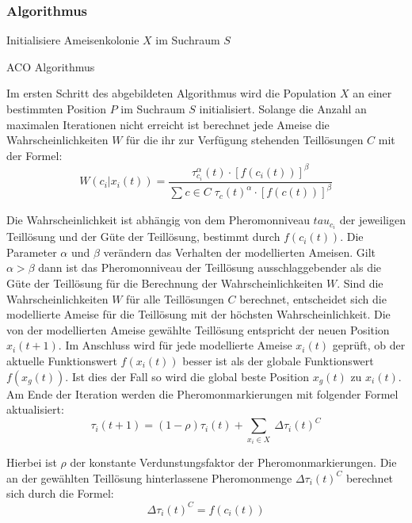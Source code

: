 \documentclass[a4paper, 11pt]{article}
\begin{document}
\subsubsection{Algorithmus}
\begin{framed}
	\begin{algorithm}[H]
		Initialisiere Ameisenkolonie $X$ im Suchraum $S$\;
		\caption{\acs{ACO} Algorithmus}
		\label{acoalgo}
	\end{algorithm}
\end{framed}
Im ersten Schritt des abgebildeten Algorithmus wird die Population $X$ an einer bestimmten Position $P$ im Suchraum $S$ initialisiert. Solange die Anzahl an maximalen Iterationen nicht erreicht ist berechnet jede Ameise die Wahrscheinlichkeiten $W$ für die ihr zur Verfügung stehenden Teillösungen $C$ mit der Formel:
\begin{equation}
W(c_{i}|x_{i}(t)) = \frac{\tau_{c_{i}}^\alpha(t) \cdot [f(c_{i}(t))]^\beta}{\sum_{} c \in C\; \tau_{c}(t)^\alpha \cdot [f(c(t))]^\beta}
\end{equation}
\par Die Wahrscheinlichkeit ist abhängig von dem Pheromonniveau $tau_{c_{i}}$ der jeweiligen Teillösung und der Güte der Teillösung, bestimmt durch $f(c_{i}(t))$. Die Parameter $\alpha$ und $\beta$ verändern das Verhalten der modellierten Ameisen. Gilt $\alpha > \beta$ dann ist das Pheromonniveau der Teillösung ausschlaggebender als die Güte der Teillösung für die Berechnung der Wahrscheinlichkeiten $W$. Sind die Wahrscheinlichkeiten $W$ für alle Teillösungen $C$ berechnet, entscheidet sich die modellierte Ameise für die Teillösung mit der höchsten Wahrscheinlichkeit. Die von der modellierten Ameise gewählte Teillösung entspricht der neuen Position $x_{i}(t+1)$. Im Anschluss wird für jede modellierte Ameise $x_{i}(t)$ geprüft, ob der aktuelle Funktionswert $f(x_{i}(t))$  besser ist als der globale Funktionswert $f(x_{g}(t))$. Ist dies der Fall so wird die global beste Position $x_{g}(t)$ zu $x_{i}(t)$. Am Ende der Iteration werden die Pheromonmarkierungen mit folgender Formel aktualisiert:
\begin{equation}
\tau_{i}(t+1) = (1 - \rho) \tau_{i}(t) + \sum_{x_{i} \in X}\ \Delta \tau_{i}(t)^C
\end{equation}
\par Hierbei ist $\rho$ der konstante Verdunstungsfaktor der Pheromonmarkierungen. Die an der gewählten Teillösung hinterlassene Pheromonmenge $\Delta \tau_{i}(t)^C$ berechnet sich durch die Formel:
\begin{equation}
\Delta \tau_{i}(t)^C = f(c_{i}(t))
\end{equation}
\newpage
\end{document}
